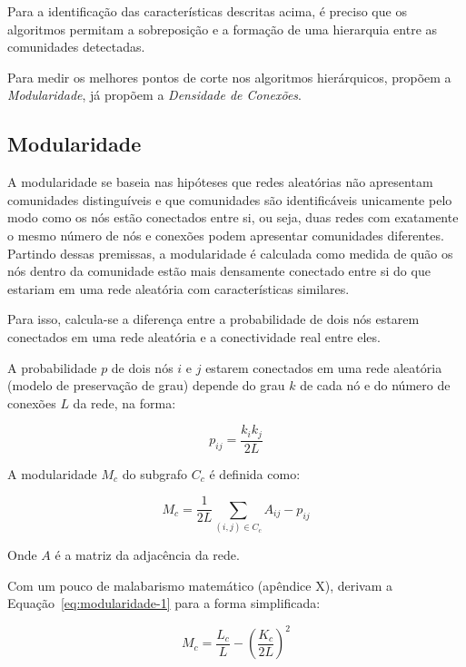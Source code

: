 \documentclass[
  article,
  11pt,
  a4paper,
  english,
  brazil,
  sumario=tradicional]{abntex2}
\begin{document}
Para a identificação das características descritas acima, é preciso que os algoritmos permitam a sobreposição e a formação de uma hierarquia entre as comunidades detectadas.

Para medir os melhores pontos de corte nos algoritmos hierárquicos,  propõem a \textit{Modularidade}, já  propõem a \textit{Densidade de Conexões}.

\subsection{Modularidade}

A modularidade se baseia nas hipóteses que redes aleatórias não apresentam comunidades distinguíveis e que comunidades são identificáveis unicamente pelo modo como os nós estão conectados entre si, ou seja, duas redes com exatamente o mesmo número de nós e conexões podem apresentar comunidades diferentes. Partindo dessas premissas, a modularidade é calculada como medida de quão os nós dentro da comunidade estão mais densamente conectado entre si do que estariam em uma rede aleatória com características similares.

Para isso, calcula-se a diferença entre a probabilidade de dois nós estarem conectados em uma rede aleatória e a conectividade real entre eles.

A probabilidade $p$ de dois nós $i$ e $j$ estarem conectados em uma rede aleatória (modelo de preservação de grau) depende do grau $k$ de cada nó e do número de conexões $L$ da rede, na forma:

\begin{equation}
p_{ij} = \frac{k_i k_j}{2L}
\end{equation}

A modularidade $M_c$ do subgrafo $C_c$ é definida como:

\begin{equation} \label{eq:modularidade-1}
M_c = \frac{1}{2L} \sum_{(i,j) \in C_c} A_{ij} - p_{ij}
\end{equation}

Onde $A$ é a matriz da adjacência da rede.

Com um pouco de malabarismo matemático (apêndice X),  derivam a Equação~\ref{eq:modularidade-1} para a forma simplificada:

\begin{equation}
M_c = \frac{L_c}{L} - \left( \frac{K_c}{2L} \right)^2
\end{equation}
\end{document}
